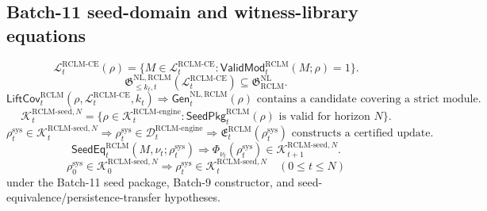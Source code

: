 \documentclass[11pt,a4paper]{article}
\newcommand{\Lcal}{\mathcal L}
\newcommand{\Kcal}{\mathcal K}
\newcommand{\Dcal}{\mathcal D}
\newcommand{\RCLM}{\mathrm{RCLM}}
\newcommand{\sys}{\mathrm{sys}}
\newcommand{\engine}{\mathrm{engine}}
\newcommand{\NL}{\mathrm{NL}}
\newcommand{\CE}{\mathrm{CE}}
\begin{document}
\subsection*{Batch-11 seed-domain and witness-library equations}
\[
\Lcal_t^{\RCLM\text{-}\CE}(\rho)
=
\{M\in\Lcal_t^{\RCLM\text{-}\CE}:\mathsf{ValidMod}_t^{\RCLM}(M;\rho)=1\}.
\]
\[
\mathfrak G_{\le k_t,t}^{\NL,\RCLM}(\Lcal_t^{\RCLM\text{-}\CE})
\subseteq
\mathfrak G_{\RCLM}^{\NL}.
\]
\[
\mathsf{LiftCov}_t^{\RCLM}(\rho,\Lcal_t^{\RCLM\text{-}\CE},k_t)
\Rightarrow
\mathsf{Gen}_t^{\NL,\RCLM}(\rho)
\text{ contains a candidate covering a strict module.}
\]
\[
\Kcal_t^{\RCLM\text{-}\mathrm{seed},N}
=
\{\rho\in\Kcal_t^{\RCLM\text{-}\engine}:
\mathsf{SeedPkg}_t^{\RCLM}(\rho)\text{ is valid for horizon }N\}.
\]
\[
\rho_t^{\sys}\in\Kcal_t^{\RCLM\text{-}\mathrm{seed},N}
\Longrightarrow
\rho_t^{\sys}\in\Dcal_t^{\RCLM\text{-}\engine}
\Longrightarrow
\mathfrak E_t^{\RCLM}(\rho_t^{\sys})\text{ constructs a certified update.}
\]
\[
\mathsf{SeedEq}_t^{\RCLM}(M,\nu_t;\rho_t^{\sys})
\Rightarrow
\Phi_{\nu_t}(\rho_t^{\sys})
\in
\Kcal_{t+1}^{\RCLM\text{-}\mathrm{seed},N}.
\]
\[
\rho_0^{\sys}\in\Kcal_0^{\RCLM\text{-}\mathrm{seed},N}
\Longrightarrow
\rho_t^{\sys}\in\Kcal_t^{\RCLM\text{-}\mathrm{seed},N}
\quad(0\le t\le N)
\]
under the Batch-11 seed package, Batch-9 constructor, and seed-equivalence/persistence-transfer hypotheses.
\end{document}
